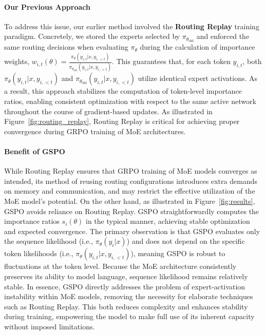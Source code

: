 \paragraph{Our Previous Approach} To address this issue, our earlier method involved the \textbf{Routing Replay} training paradigm. Concretely, we stored the experts selected by $\pi_{\theta_\text{old}}$ and enforced the same routing decisions when evaluating $\pi_{\theta}$ during the calculation of importance weights, $w_{i,t}(\theta) = \frac{ \pi_{\theta} (y_{i,t} | x, y_{i,<t}) }{ \pi_{\theta_\text{old}} (y_{i,t} | x,y_{i,<t})}$. This guarantees that, for each token $y_{i,t}$, both $\pi_{\theta} (y_{i,t} | x, y_{i,<t})$ and $\pi_{\theta_\text{old}} (y_{i,t} | x,y_{i,<t})$ utilize identical expert activations. As a result, this approach stabilizes the computation of token-level importance ratios, enabling consistent optimization with respect to the same active network throughout the course of gradient-based updates. 
As illustrated in Figure~\ref{fig:routing_replay}, Routing Replay is critical for achieving proper convergence during GRPO training of MoE architectures.

\paragraph{Benefit of GSPO} While Routing Replay ensures that GRPO training of MoE models converges as intended, its method of reusing routing configurations introduces extra demands on memory and communication, and may restrict the effective utilization of the MoE model’s potential. On the other hand, as illustrated in Figure~\ref{fig:results}, GSPO avoids reliance on Routing Replay. GSPO straightforwardly computes the importance ratios $s_i(\theta)$ in the typical manner, achieving stable optimization and expected convergence. The primary observation is that GSPO evaluates only the sequence likelihood (i.e., $\pi_{\theta} (y_i | x)$) and does not depend on the specific token likelihoods (i.e., $\pi_{\theta} (y_{i,t} | x, y_{i,<t})$), meaning GSPO is robust to fluctuations at the token level. Because the MoE architecture consistently preserves its ability to model language, sequence likelihood remains relatively stable. In essence, GSPO directly addresses the problem of expert-activation instability within MoE models, removing the necessity for elaborate techniques such as Routing Replay. This both reduces complexity and enhances stability during training, empowering the model to make full use of its inherent capacity without imposed limitations.

